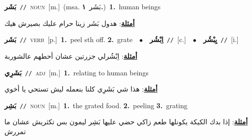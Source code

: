 \documentclass[10pt,a4paper,twoside]{article} %
\begin{document}
\begin{multicols}{2}
{\setlength\topsep{0pt}\textbf{\foreignlanguage{arabic}{بَشَر}}\ {\color{gray}\texttt{//}\color{black}}\ \textsc{noun}\ [m.]\ \color{gray}(msa. \foreignlanguage{arabic}{بَشَر}~\foreignlanguage{arabic}{\textbf{١.}})\color{black}\ \textbf{1.}~human beings\  \begin{flushright}\color{gray}\foreignlanguage{arabic}{\textbf{\underline{\foreignlanguage{arabic}{أمثلة}}}: هدول بَشَر زينا حرام عليك بصيرش هيك}\end{flushright}\color{black}} \vspace{2mm}

{\setlength\topsep{0pt}\textbf{\foreignlanguage{arabic}{بَشَر}}\ {\color{gray}\texttt{//}\color{black}}\ \textsc{verb}\ [p.]\ \textbf{1.}~peel sth off.  \textbf{2.}~grate\ \ $\bullet$\ \ \setlength\topsep{0pt}\textbf{\foreignlanguage{arabic}{اِبْشُر}}\ {\color{gray}\texttt{//}\color{black}}\ [c.]\ \ $\bullet$\ \ \setlength\topsep{0pt}\textbf{\foreignlanguage{arabic}{يِبْشُر}}\ {\color{gray}\texttt{//}\color{black}}\ [i.]\  \begin{flushright}\color{gray}\foreignlanguage{arabic}{\textbf{\underline{\foreignlanguage{arabic}{أمثلة}}}: اِبْشُرلي جزرتين عشان أحطهم عالشوربة}\end{flushright}\color{black}} \vspace{2mm}

{\setlength\topsep{0pt}\textbf{\foreignlanguage{arabic}{بَشَرِي}}\ {\color{gray}\texttt{//}\color{black}}\ \textsc{adj}\ [m.]\ \textbf{1.}~relating to human beings\  \begin{flushright}\color{gray}\foreignlanguage{arabic}{\textbf{\underline{\foreignlanguage{arabic}{أمثلة}}}: هذا شي بَشَرِي كلنا بنعمله ليش تستحي يا أخوي}\end{flushright}\color{black}} \vspace{2mm}

{\setlength\topsep{0pt}\textbf{\foreignlanguage{arabic}{بَشِر}}\ {\color{gray}\texttt{//}\color{black}}\ \textsc{noun}\ [m.]\ \textbf{1.}~the grated food.  \textbf{2.}~peeling  \textbf{3.}~grating\  \begin{flushright}\color{gray}\foreignlanguage{arabic}{\textbf{\underline{\foreignlanguage{arabic}{أمثلة}}}: إذا بدك الكيكة يكونلها طعم زاكي حضي عليها بَشِر ليمون بس تكثريش عشان ما تمررش}\end{flushright}\color{black}} \vspace{2mm}


\end{multicols}
\end{document}

